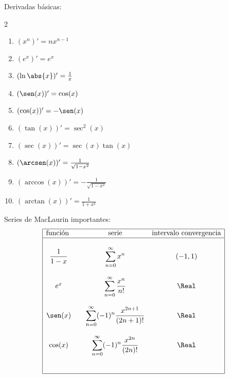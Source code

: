 \documentclass{article}
\begin{document}
{\large Derivadas básicas:}
\begin{multicols}{2}
  \begin{enumerate}
    \item $(x^n)' = nx^{n-1}$
    \item $(e^x)' = e^x$
    \item $(\ln\abs{x})' = \frac{1}{x}$
    \item $(\sen(x))' = \cos(x)$
    \item $(\cos(x))' = -\sen(x)$
    \item $(\tan(x))' = \sec^2(x)$
    \item $(\sec(x))' = \sec(x)\tan(x)$
    \item $(\arcsen(x))' = \frac{1}{\sqrt{1-x^2}}$
    \item $(\arccos(x))' = -\frac{1}{\sqrt{1-x^2}}$
    \item $(\arctan(x))' = \frac{1}{1+x^2}$
  \end{enumerate}
\end{multicols}
\vspace{2mm}

{\large Series de MacLaurin importantes:
$$\begin{array}{|cccc|}
  \hline
  \text{función } & & \text{serie} & \text{intervalo convergencia}\\
  \hline
  & & & \\
  \dfrac{1}{1-x} & & \displaystyle\sum_{n=0}^\infty x^n & (-1,1)\\
  & & & \\
  e^x & & \displaystyle\sum_{n=0}^\infty \frac{x^n}{n!} & \Real\\
  & & & \\
  \sen(x) & & \displaystyle\sum_{n=0}^\infty (-1)^n\frac{x^{2n+1}}{(2n+1)!} & \Real\\
  & & & \\
  \cos(x) & & \displaystyle\sum_{n=0}^\infty (-1)^n\frac{x^{2n}}{(2n)!} & \Real\\
  & & & \\
  & & & \\
  \hline
\end{array}$$}
\vspace{2mm}
\end{document}
